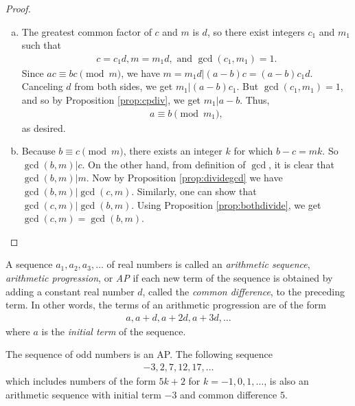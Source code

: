 \documentclass{subfile}
\begin{document}
	\begin{proof}
		$ $
		\begin{enumerate}[(a)]
			\item The greatest common factor of $c$ and $m$ is $d$, so  there exist integers $c_1$ and $m_1$ such that
				\begin{align*}
				 c=c_1d, m = m_1 d, \text{ and } \gcd(c_1,m_1) = 1.
				\end{align*}
			Since $ac \equiv bc \pmod m$, we have $m=m_1d|(a-b)c=(a-b)c_1d$. Canceling $d$ from both sides, we get $m_1 | (a-b)c_1$. But $\gcd(c_1,m_1)=1$, and so by Proposition \ref{prop:cpdiv}, we get $m_1|a-b$. Thus,
				\begin{align*} 
				a \equiv b \pmod{m_1},
				\end{align*}
			as desired.
			
			\item Because $b \equiv c \pmod m$, there exists an integer $k$ for which $b-c=mk$. So $\gcd(b,m)|c$. On the other hand, from definition of $\gcd$, it is clear that $\gcd(b,m)|m$. Now by Proposition \ref{prop:dividegcd} we have $\gcd(b,m)|\gcd(c,m)$. Similarly, one can show that $\gcd(c,m)|\gcd(b,m)$. Using Proposition \ref{prop:bothdivide}, we get $\gcd(c,m)=\gcd(b,m)$. 
		\end{enumerate}
	\end{proof}
	
	\begin{definition}\label{def:AP}
		A sequence $a_1, a_2, a_3, \dots$ of real numbers is called an \textit{arithmetic sequence}, \textit{arithmetic progression}, or \textit{AP} if each new term of the sequence is obtained by adding a constant real number $d$, called the \textit{common difference}, to the preceding term. In other words, the terms of an arithmetic progression are of the form
			\begin{align*}
				a, a+d, a+2d, a+3d, \dots
			\end{align*}
		where $a$ is the \textit{initial term} of the sequence.
	\end{definition}
	
	\begin{example}
		The sequence of odd numbers is an AP. The following sequence
			\begin{align*}
				-3, 2, 7, 12, 17, \dots
			\end{align*}
		which includes numbers of the form $5k+2$ for $k=-1,0,1,\dots$, is also an arithmetic sequence with initial term $-3$ and common difference $5$.
	\end{example}
	
\end{document}

